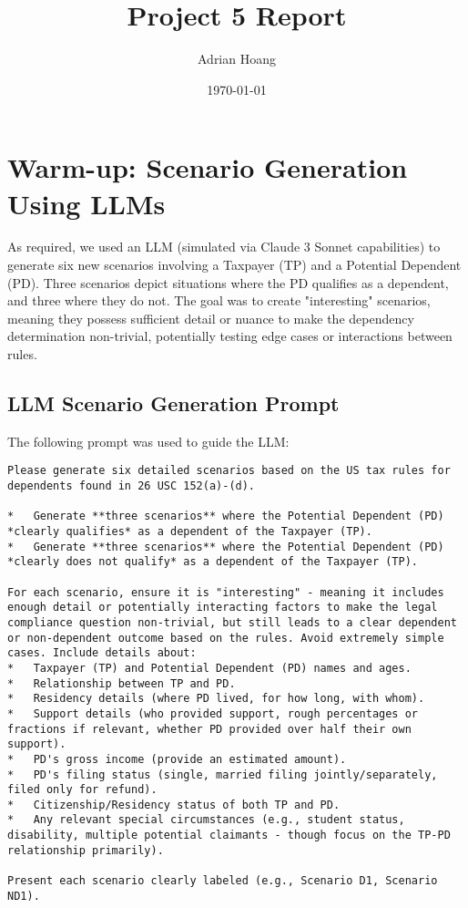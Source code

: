 \documentclass[11pt, letterpaper]{article}
\title{Project 5 Report}
\author{Adrian Hoang}
\date{\today} %
\begin{document}
\maketitle %

\section{Warm-up: Scenario Generation Using LLMs}

As required, we used an LLM (simulated via Claude 3 Sonnet capabilities) to generate six new scenarios involving a Taxpayer (TP) and a Potential Dependent (PD). Three scenarios depict situations where the PD qualifies as a dependent, and three where they do not. The goal was to create "interesting" scenarios, meaning they possess sufficient detail or nuance to make the dependency determination non-trivial, potentially testing edge cases or interactions between rules.

\subsection{LLM Scenario Generation Prompt}
The following prompt was used to guide the LLM:
\begin{lstlisting}[style=promptstyle, caption={LLM Prompt for Generating Project 5 Scenarios}]
Please generate six detailed scenarios based on the US tax rules for dependents found in 26 USC 152(a)-(d).

*   Generate **three scenarios** where the Potential Dependent (PD) *clearly qualifies* as a dependent of the Taxpayer (TP).
*   Generate **three scenarios** where the Potential Dependent (PD) *clearly does not qualify* as a dependent of the Taxpayer (TP).

For each scenario, ensure it is "interesting" - meaning it includes enough detail or potentially interacting factors to make the legal compliance question non-trivial, but still leads to a clear dependent or non-dependent outcome based on the rules. Avoid extremely simple cases. Include details about:
*   Taxpayer (TP) and Potential Dependent (PD) names and ages.
*   Relationship between TP and PD.
*   Residency details (where PD lived, for how long, with whom).
*   Support details (who provided support, rough percentages or fractions if relevant, whether PD provided over half their own support).
*   PD's gross income (provide an estimated amount).
*   PD's filing status (single, married filing jointly/separately, filed only for refund).
*   Citizenship/Residency status of both TP and PD.
*   Any relevant special circumstances (e.g., student status, disability, multiple potential claimants - though focus on the TP-PD relationship primarily).

Present each scenario clearly labeled (e.g., Scenario D1, Scenario ND1).
\end{lstlisting}
\end{document}
